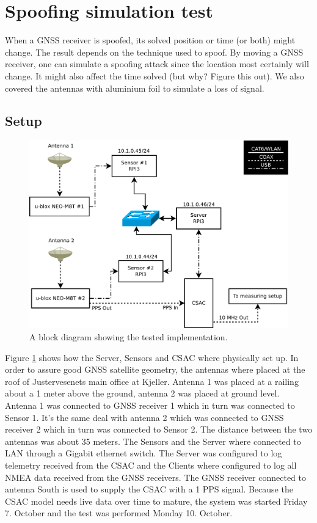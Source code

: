 \documentclass[12pt,english,a4paper]{report}
\begin{document}
\section{Spoofing simulation test}
When a GNSS receiver is spoofed, its solved position or time (or both) might change. The result depends on the technique used to spoof. By moving a GNSS receiver, one can simulate a spoofing attack since the location most certainly will change. It might also affect the time solved (but why? Figure this out). We also covered the antennas with aluminium foil to simulate a loss of signal. 

\subsection{Setup}
\begin{figure}
\centering
  \includegraphics[scale=0.31]{server_layout.pdf}
   \caption[CSAC SMACC implementation block diagram]{A block diagram showing the tested implementation.}
   \label{ibd}
\end{figure}
Figure \ref{ibd} shows how the Server, Sensors and CSAC where physically set up. In order to assure good GNSS satellite geometry, the antennas where placed at the roof of Justervesenets main office at Kjeller. Antenna 1 was placed at a railing about a 1 meter above the ground, antenna 2 was placed at ground level. Antenna 1 was connected to GNSS receiver 1 which in turn was connected to Sensor 1. It's the same deal with antenna 2 which was connected to GNSS receiver 2 which in turn was connected to Sensor 2. The distance between the two antennas was about 35 meters. The Sensors and the Server where connected to LAN through a Gigabit ethernet switch. The Server was configured to log telemetry received from the CSAC and the Clients where configured to log all NMEA data received from the GNSS receivers. The GNSS receiver connected to antenna South is used to supply the CSAC with a 1 PPS signal. Because the CSAC model needs live data over time to mature, the system was started Friday 7. October and the test was performed Monday 10. October.
\end{document}
